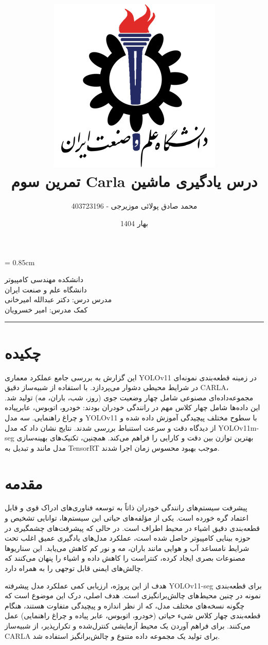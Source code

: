 \documentclass[oneside]{report}
\title{
    \includegraphics[width=0.5\linewidth]{images/iust.png}
    \\
    تمرین سوم Carla درس یادگیری ماشین
    }
\author{محمد صادق پولائی موزیرجی - 403723196}
\date{بهار 1404}
\begin{document}
\maketitle
\tableofcontents
\listoffigures
\listoftables

\baselineskip = 0.85cm

\newpage
\begin{center}
  دانشکده مهندسی کامپیوتر \\
  دانشگاه علم و صنعت ایران \\[1ex]
  مدرس درس: دکتر عبدالله امیرخانی \\
  کمک مدرس: امیر خسرویان
\end{center}

\hrule
\chapter{چکیده}
این گزارش به بررسی جامع عملکرد معماری YOLOv11 در زمینه قطعه‌بندی نمونه‌ای  در شرایط محیطی دشوار می‌پردازد. با استفاده از شبیه‌ساز دقیق CARLA، مجموعه‌داده‌ای مصنوعی شامل چهار وضعیت جوی (روز، شب، باران، مه) تولید شد. این داده‌ها شامل چهار کلاس مهم در رانندگی خودران بودند: خودرو، اتوبوس، عابرپیاده و چراغ‌ راهنمایی. سه مدل YOLOv11 با سطوح مختلف پیچیدگی  آموزش داده شده و از دیدگاه دقت و سرعت استنباط بررسی شدند. نتایج نشان داد که مدل YOLOv11m-seg بهترین توازن بین دقت و کارایی را فراهم می‌کند. همچنین، تکنیک‌های بهینه‌سازی مدل مانند  و تبدیل به TensorRT موجب بهبود محسوس زمان اجرا شدند.

\newpage

\chapter{مقدمه}
پیشرفت سیستم‌های رانندگی خودران ذاتاً به توسعه فناوری‌های ادراک قوی و قابل اعتماد گره خورده است. یکی از مؤلفه‌های حیاتی این سیستم‌ها، توانایی تشخیص و قطعه‌بندی دقیق اشیاء در محیط اطراف است. در حالی که پیشرفت‌های چشمگیری در حوزه بینایی کامپیوتر حاصل شده است، عملکرد مدل‌های یادگیری عمیق اغلب تحت شرایط نامساعد آب و هوایی مانند باران، مه و نور کم کاهش می‌یابد. این سناریوها مصنوعات بصری ایجاد کرده، کنتراست را کاهش داده و اشیاء را پنهان می‌کنند که چالش‌های ایمنی قابل توجهی را به همراه دارد.

هدف از این پروژه، ارزیابی کمی عملکرد مدل پیشرفته YOLOv11-seg برای قطعه‌بندی نمونه در چنین محیط‌های چالش‌برانگیزی است. هدف اصلی، درک این موضوع است که چگونه نسخه‌های مختلف مدل، که از نظر اندازه و پیچیدگی متفاوت هستند، هنگام قطعه‌بندی چهار کلاس شیء حیاتی (خودرو، اتوبوس، عابر پیاده و چراغ راهنمایی) عمل می‌کنند. برای فراهم آوردن یک محیط آزمایشی کنترل‌شده و تکرارپذیر، از شبیه‌ساز CARLA برای تولید یک مجموعه داده متنوع و چالش‌برانگیز استفاده شد.
\end{document}
